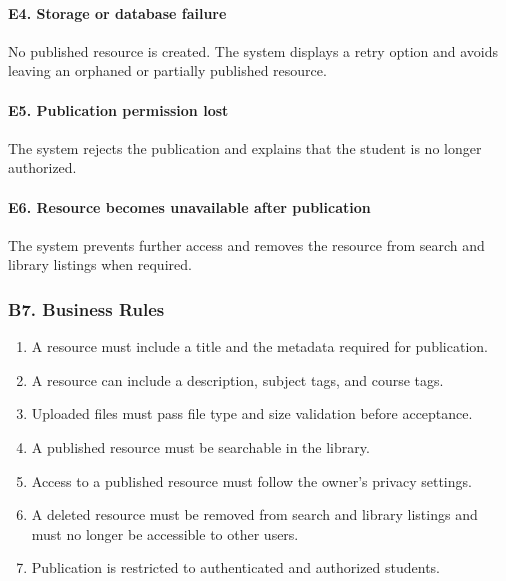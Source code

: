 \documentclass[12pt]{article}
\begin{document}
\hypertarget{sec:e4-storage-or-database-failure}{}
\paragraph*{E4. Storage or database failure}
\par\medskip

No published resource is created. The system displays a retry option and avoids leaving an orphaned or partially published resource.
\par\medskip

\hypertarget{sec:e5-publication-permission-lost}{}
\paragraph*{E5. Publication permission lost}
\par\medskip

The system rejects the publication and explains that the student is no longer authorized.
\par\medskip

\hypertarget{sec:e6-resource-becomes-unavailable-after-publication}{}
\paragraph*{E6. Resource becomes unavailable after publication}
\par\medskip

The system prevents further access and removes the resource from search and library listings when required.
\par\medskip

\hypertarget{sec:b7-business-rules}{}
\subsubsection*{B7. Business Rules}
\par\medskip

\begin{enumerate}
\item A resource must include a title and the metadata required for publication.
\item A resource can include a description, subject tags, and course tags.
\item Uploaded files must pass file type and size validation before acceptance.
\item A published resource must be searchable in the library.
\item Access to a published resource must follow the owner's privacy settings.
\item A deleted resource must be removed from search and library listings and must no longer be accessible to other users.
\item Publication is restricted to authenticated and authorized students.
\end{enumerate}
\par\medskip
\end{document}
